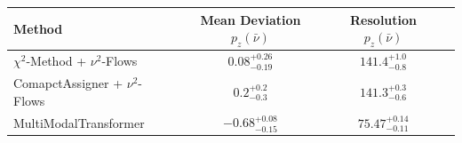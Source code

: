     \begin{tabular}{lccc}
        \toprule
        Method & Mean Deviation $p_{z}(\bar{\nu})$ & Resolution $p_{z}(\bar{\nu})$ \\
        \midrule
        $\chi^2$-Method + $\nu^2$-Flows & $0.08^{+0.26}_{-0.19}$ & $141.4^{+1.0}_{-0.8}$ \\
        ComapctAssigner + $\nu^2$-Flows & $0.2^{+0.2}_{-0.3}$ & $141.3^{+0.3}_{-0.6}$ \\
        MultiModalTransformer & $-0.68^{+0.08}_{-0.15}$ & $75.47^{+0.14}_{-0.11}$ \\
        \bottomrule
    \end{tabular}